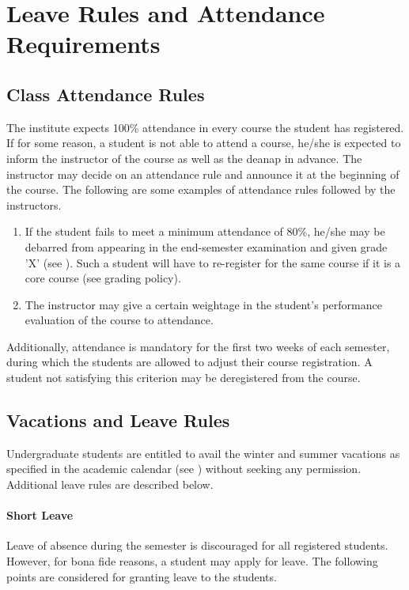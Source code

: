 \section{Leave Rules and Attendance Requirements}

\subsection{Class Attendance Rules}

The \gls{institute} expects 100\% attendance in every course the \gls{student} has registered. If for some reason, a \gls{student} is not able to attend a course, he/she is expected to inform the instructor of the course as well as the \acrshort{deanap} in advance. The instructor may decide on an attendance rule and announce it at the beginning of the course. The following are some examples of attendance rules followed by the instructors.

\begin{enumerate}[leftmargin=15mm]
    \item If the \gls{student} fails to meet a minimum attendance of 80\%, he/she may be debarred from appearing in the end-semester examination and given grade 'X' (see ). Such a \gls{student} will have to re-register for the same course if it is a core course (see grading policy).
    \item The instructor may give a certain weightage in the \gls{student}’s performance evaluation of the course to attendance.
\end{enumerate}

Additionally, attendance is mandatory for the first two weeks of each semester, during which the \glspl{student} are allowed to adjust their course registration. A \gls{student} not satisfying this criterion may be deregistered from the course.

\subsection{Vacations and Leave Rules}

Undergraduate \glspl{student} are entitled to avail the winter and summer vacations as specified in the academic calendar (see ) without seeking any permission. Additional leave rules are described below.

\paragraph{Short Leave} Leave of absence during the semester is discouraged for all registered \glspl{student}. However, for bona fide reasons, a \gls{student} may apply for leave. The following points are considered for granting leave to the \glspl{student}.

